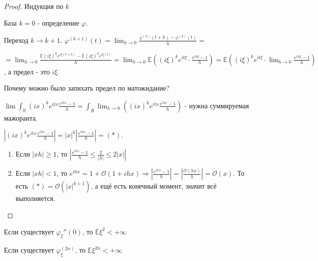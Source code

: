 \begin{proof}
    Индукция по $k$

    База $k = 0$ - определение $\varphi$.

    Переход $k \to k + 1$. $\varphi^{(k + 1)}(t) = \lim_{h \to 0} \frac{\varphi^{(k)}(t + h) - \varphi^{(k)}(t)}{h} = $

    $= \lim_{h \to 0} \frac{\mathbb{E} (i \xi)^k e^{i\xi(t + h)} - \mathbb{E} (i \xi)^k e^{i\xi(t)}}{h} = 
    \lim_{h \to 0} \mathbb{E} ((i \xi)^k e^{i t \xi} \cdot \frac{e^{ih\xi} - 1}{h}) = \mathbb{E} ((i\xi)^k e^{i t \xi} \cdot \lim_{h \to 0} \frac{e^{i h \xi} - 1}{h})$, а предел - это $i \xi$.

    Почему можно было запихать предел по матожидание?

    $\lim \int_{\mathbb{R}} (ix)^k e^{itx} \frac{e^{ihx} - 1}{h} = \int_{R} \lim_{h \to 0} ((ix)^k e^{itx} \frac{e^{ihx} - 1}{h})$ - нужна суммируемая мажоранта.

    $\left | (ix)^k e^{itx} \frac{e^{ihx} - 1}{h}  \right | = |x|^k \left | \frac{e^{ihx} - 1}{h} \right | = (*)$.

    \begin{enumerate}
        \item {
            Если $|xh| \geqslant 1$, то $\left | \frac{e^{ihx} - 1}{h} \leqslant \frac{2}{|h|} \leqslant 2|x| \right |$
        }
        \item {
            Если $|xh| < 1$, то $e^{ihx} = 1 + \mathcal{O}(1 + ihx) \Rightarrow \left | \frac{e^{ihx} - 1}{h}  \right | = \left | \frac{\mathcal{O}(hx)}{h}  \right | = \mathcal{O}(x)$.
            То есть $(*) = \mathcal{O}(|x|^{k + 1})$, а ещё есть конечный момент, значит всё выполняется.
        }
    \end{enumerate}
\end{proof}

\begin{theorem}
    Если существует $\varphi_{\xi}''(0)$, то $\mathbb{E} \xi^2 < +\infty$
\end{theorem}

\begin{remark}
    Если существует $\varphi_{\xi}^{(2n)}$, то $\mathbb{E} \xi^{2n} < +\infty$
\end{remark}

